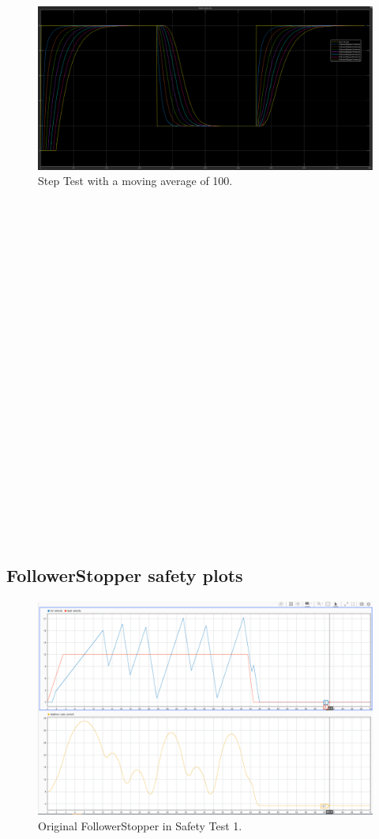 \documentclass[conference]{IEEEtran}
\begin{document}
\begin{appendix}
\begin{figure}[htbp!]
\centerline{\includegraphics[width=6.50 in]{multiFS_velbad_ma100.png}}
\caption{Step Test with a moving average of 100.}
\label{ma100}
\end{figure}

\begin{verbatim}























\end{verbatim}
\pagebreak
\subsection{FollowerStopper safety plots}

\begin{figure}[htbp]
\centerline{\includegraphics[width=5.71 in]{oldFS_safety1.png}}
\caption{Original FollowerStopper in Safety Test 1.}
\label{oldsafe1}
\end{figure}


\end{appendix}
\end{document}

